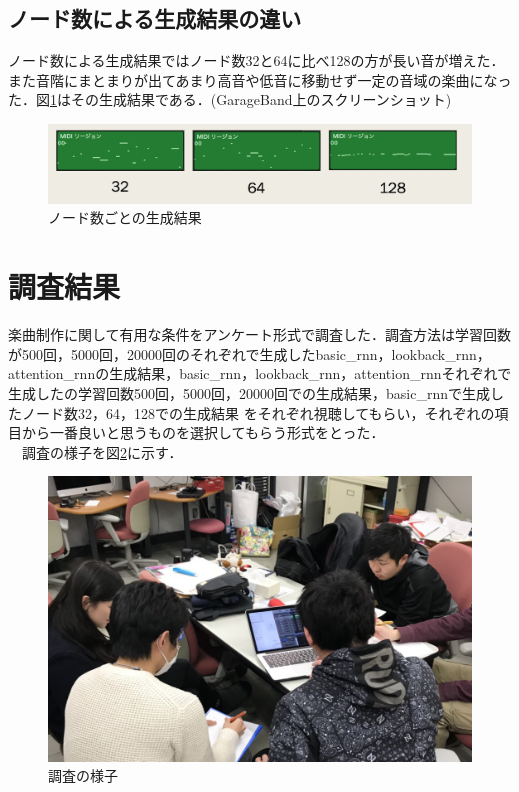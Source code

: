 \subsection{ノード数による生成結果の違い}
ノード数による生成結果ではノード数32と64に比べ128の方が長い音が増えた．また音階にまとまりが出てあまり高音や低音に移動せず一定の音域の楽曲になった．図\ref{fig:ノード数ごとの生成結果}はその生成結果である．(GarageBand上のスクリーンショット)
\begin{figure}[h]
    \begin{screen}
    \begin{center}
        \includegraphics[scale=0.68, clip]{./img/nodo.png}
        \caption{ノード数ごとの生成結果}
        \label{fig:ノード数ごとの生成結果}
    \end{center}
    \end{screen}
\end{figure}
\newpage
\section{調査結果}
楽曲制作に関して有用な条件をアンケート形式で調査した．調査方法は学習回数が500回，5000回，20000回のそれぞれで生成したbasic\_rnn，lookback\_rnn，attention\_rnnの生成結果，basic\_rnn，lookback\_rnn，attention\_rnnそれぞれで生成したの学習回数500回，5000回，20000回での生成結果，basic\_rnnで生成したノード数32，64，128での生成結果
をそれぞれ視聴してもらい，それぞれの項目から一番良いと思うものを選択してもらう形式をとった．\\
　調査の様子を図\ref{fig:調査の様子}に示す．
\begin{figure}[h]
    \begin{screen}
    \begin{center}
        \includegraphics[scale=0.7, clip]{./img/tyousa1.png}
        \caption{調査の様子}
        \label{fig:調査の様子}
    \end{center}
    \end{screen}
\end{figure}
\newpage
